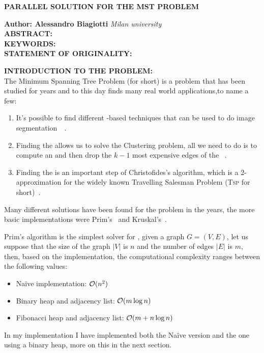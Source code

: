 \documentclass[a4paper,10pt]{article}
\begin{document}
\noindent
\begin{center}
	\textbf{{PARALLEL SOLUTION FOR THE MST PROBLEM}} \\
\end{center}

\noindent
\textbf{Author: Alessandro Biagiotti} \hfill \textit{Milan university}
\\

\noindent
\textbf{ABSTRACT:}
\\

\noindent
\textbf{KEYWORDS:}
\\

\noindent
\textbf{STATEMENT OF ORIGINALITY:}

\bigskip

\makeatletter{}\makeatother
\label{sec:intro}
\noindent
\textbf{INTRODUCTION TO THE PROBLEM:}
\\
The Minimum Spanning Tree Problem (\mstp for short) is a problem that has been studied for years and to this day finds many real world applications,to name a few:
\begin{enumerate}
	\item It's possible to find different \mst-based techniques that can be used to do image segmentation~\cite{maze-generation}~\cite{mst-segmentation-heuristic}.
	\item Finding the \mst allows us to solve the Clustering problem, all we need to do is to compute an \mst and then drop the $k - 1$ most expensive edges of the \mst~\cite{mst-applications}.
	\item Finding the \mst is an important step of Christofides's algorithm, which is a 2-approximation for the widely known Travelling Salesman Problem (\textsc{Tsp} for short)~\cite{tsp-christofides}.
\end{enumerate}

Many different solutions have been found for the problem in the years, the more basic implementations were Prim's~\cite{prim-algorithm} and Kruskal's~\cite{kruskal-algorithm}.

Prim's algorithm is the simplest solver for \mstp, given a graph $G= (V, E)$, let us suppose that the size of the graph $|V|$ is $n$ and the number of edges $|E|$ is $m$, then, based on the implementation, the computational complexity ranges between the following values:
\begin{itemize}
	\item Naïve implementation: $\mathcal{O}(n^2)$
	\item Binary heap and adjacency list: $\mathcal{O}(m\log{n})$
	\item Fibonacci heap and adjacency list: $\mathcal{O}(m + n\log{n})$
\end{itemize}
In my implementation I have implemented both the Naïve version and the one using a binary heap, more on this in the next section.
\end{document}
